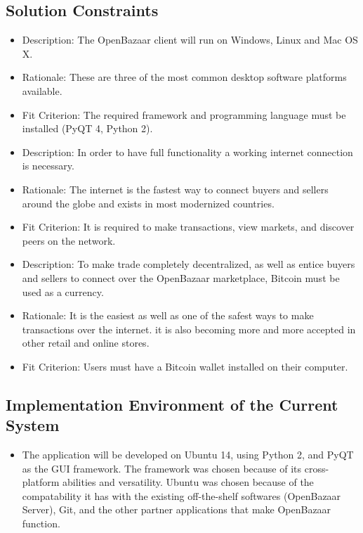 \documentclass{article}
\begin{document}
\subsection{Solution Constraints}
\begin{itemize}

\item
Description: The OpenBazaar client will run on Windows, Linux and Mac OS X. 

\item
Rationale: These are three of the most common desktop software platforms available. 

\item
Fit Criterion: The required framework and programming language must be installed (PyQT 4, Python 2).

\item
Description: In order to have full functionality a working internet connection is necessary.

\item
Rationale: The internet is the fastest way to connect buyers and sellers around the globe and exists in most modernized countries.

\item
Fit Criterion: It is required to make transactions, view markets, and discover peers on the network.

\item
Description: To make trade completely decentralized, as well as entice buyers and sellers to connect over the OpenBazaar marketplace, Bitcoin must be used as a currency. 

\item
Rationale: It is the easiest as well as one of the safest ways to make transactions over the internet. it is also becoming more and more accepted in other retail and online stores. 

\item
Fit Criterion: Users must have a Bitcoin wallet installed on their computer. 

\end{itemize}

\subsection{Implementation Environment of the Current System}

\begin{itemize}
\item
The application will be developed on Ubuntu 14, using Python 2, and PyQT as the GUI framework. The framework was chosen because of its cross-platform abilities and versatility. Ubuntu was chosen because of the compatability it has with the existing off-the-shelf softwares (OpenBazaar Server), Git, and the other partner applications that make OpenBazaar function. 
\end{itemize}
\end{document}
